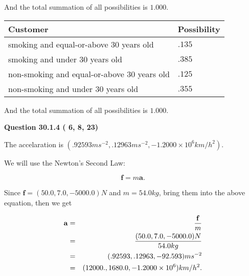 \documentclass[12pt]{article}
\begin{document}
\noindent
And the total summation of all possibilities is $  %
1.000 $.
 
 
 
 
 
 
\noindent{}

 
\noindent
\begin{tabular}{|l|l|}
\hline
Customer & Possibility \\
\hline
smoking  and  %
equal-or-above 30 years old &
  $ %
.135$ \\
\hline
smoking  and  %
under 30 years old &
  $ %
.385$ \\
\hline
 non-smoking and  %
equal-or-above 30 years old &
  $ %
.125$ \\
\hline
 non-smoking and  %
under 30 years old &
  $ %
.355$ \\
\hline
\end{tabular}
 
\noindent
 And the total summation of all possibilities is $  %
1.000 $.
 
 
 
  
\vspace{0.2in}
  
{\textbf{\Large{Question
30.1.4 
 (          6,          8,         23)
}}}
  
  
 
 
\noindent{}
 
 
The accelaration is
$(
.92593ms^{-2},
.12963ms^{-2},
-1.2000 \times 10^{6}km/h^2
).
$
 
 
 
 
 
 
\noindent{}

We will use the Newton's Second Law:
 
\[
\mathbf{f}=m\mathbf{a}.
\]
 
Since $\mathbf{f}=( %
50.0,  %
7.0,  %
-5000.0 )N$
and $m= %
54.0kg$, bring them into the above equation, then we get
 
\begin{eqnarray*}
\mathbf{a}&=&\frac{\mathbf{f}}m  \\
&=&\frac{(
50.0 ,
7.0 ,
-5000.0 )N
}{ %
54.0 kg}  \\
&=&(
.92593 ,
.12963,
-92.593
)ms^{-2} \\
&=&(
12000. ,
1680.0 ,
-1.2000 \times 10^{6}
)km/h^2.
\end{eqnarray*}
 
\end{document}
